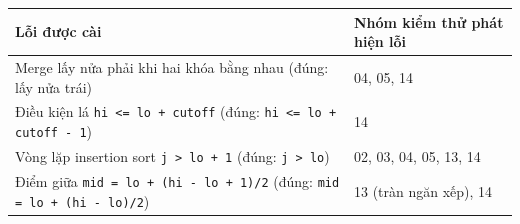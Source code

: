 \begin{tabularx}{\linewidth}{Xl}
\toprule
Lỗi được cài & Nhóm kiểm thử phát hiện lỗi \\
\midrule
Merge lấy nửa phải khi hai khóa bằng nhau (đúng: lấy nửa trái) & 04, 05, 14 \\
Điều kiện lá \texttt{hi <= lo + cutoff} (đúng: \texttt{hi <= lo + cutoff - 1}) & 14 \\
Vòng lặp insertion sort \texttt{j > lo + 1} (đúng: \texttt{j > lo}) & 02, 03, 04, 05, 13, 14 \\
Điểm giữa \texttt{mid = lo + (hi - lo + 1)/2} (đúng: \texttt{mid = lo + (hi - lo)/2}) & 13 (tràn ngăn xếp), 14 \\
\bottomrule
\end{tabularx}
